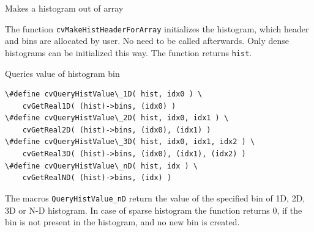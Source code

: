 Makes a histogram out of array


\begin{description}
\end{description}

The function \texttt{cvMakeHistHeaderForArray} initializes the histogram, which header and bins are allocated by user. No  need to be called afterwards. Only dense histograms can be initialized this way. The function returns \texttt{hist}.

\label{QueryHistValue_nD}

Queries value of histogram bin

\begin{lstlisting}
\#define cvQueryHistValue\_1D( hist, idx0 ) \
    cvGetReal1D( (hist)->bins, (idx0) )
\#define cvQueryHistValue\_2D( hist, idx0, idx1 ) \
    cvGetReal2D( (hist)->bins, (idx0), (idx1) )
\#define cvQueryHistValue\_3D( hist, idx0, idx1, idx2 ) \
    cvGetReal3D( (hist)->bins, (idx0), (idx1), (idx2) )
\#define cvQueryHistValue\_nD( hist, idx ) \
    cvGetRealND( (hist)->bins, (idx) )
\end{lstlisting}

\begin{description}
\cvarg{hist}{Histogram}
\end{description}

The macros \texttt{QueryHistValue\_nD} return the value of the specified bin of 1D, 2D, 3D or N-D histogram. In case of sparse histogram the function returns 0, if the bin is not present in the histogram, and no new bin is created.

\label{GetHistValue_nD}

